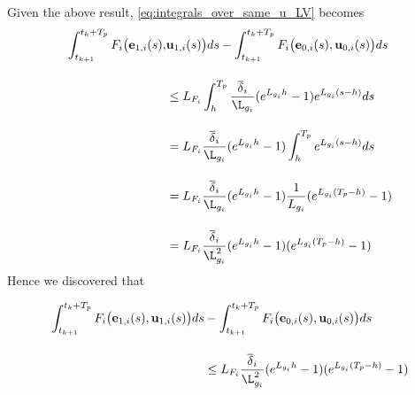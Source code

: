 Given the above result, \eqref{eq:integrals_over_same_u_LV} becomes
\begin{align}
  \int_{t_{k+1}}^{t_k + T_p} F_i \big(\vect{e}_{1,i}(s),& \vect{u}_{1,i} (s)\big) d s
    - \int_{t_{k+1}}^{t_k + T_p} F_i \big(\vect{e}_{0,i}(s), \vect{u}_{0,i} (s)\big) d s \\[2.5ex]
  & \leq L_{F_i}\int_{h}^{T_p} \dfrac{\overline{\delta}_i}{\L_{g_i}} (e^{L_{g_i}h} - 1) e^{L_{g_i}(s-h)} d s \\[2.5ex]
  &=  L_{F_i} \dfrac{\overline{\delta}_i}{\L_{g_i}} (e^{L_{g_i}h} - 1) \int_{h}^{T_p} e^{L_{g_i}(s-h)} d s \\[2.5ex]
  & = L_{F_i} \dfrac{\overline{\delta}_i}{\L_{g_i}} (e^{L_{g_i} h} - 1) \dfrac{1}{L_{g_i}}(e^{L_{g_i}(T_p-h)} - 1) \\[2.5ex]
  & = L_{F_i} \dfrac{\overline{\delta}_i}{\L_{g_i}^2} (e^{L_{g_i} h} - 1) (e^{L_{g_i}(T_p-h)} - 1)
\end{align}
Hence we discovered that
\begin{bw_box}
\begin{align}
  \int_{t_{k+1}}^{t_k + T_p} F_i \big(\vect{e}_{1,i}(s), \vect{u}_{1,i} (s)\big) d s
  &- \int_{t_{k+1}}^{t_k + T_p} F_i \big(\vect{e}_{0,i}(s), \vect{u}_{0,i} (s)\big) d s \\[2.5ex]
  & \leq L_{F_i} \dfrac{\overline{\delta}_i}{\L_{g_i}^2} (e^{L_{g_i} h} - 1) (e^{L_{g_i}(T_p-h)} - 1)
\label{eq:end_result_two_integrals}
\end{align}
\end{bw_box}

